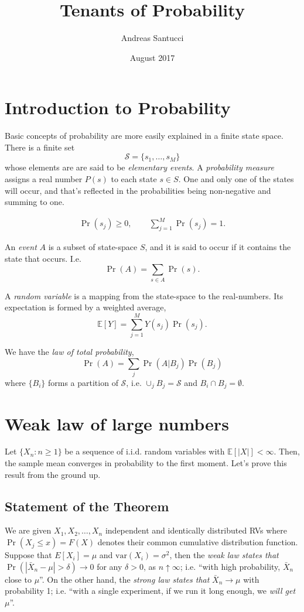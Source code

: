 \documentclass[12pt]{article}  \usepackage{algorithm2e} \usepackage{amsmath} \usepackage{amsthm} \usepackage{amsfonts} \usepackage{bbm} \usepackage{color,soul} \usepackage{framed} \usepackage[margin=0.5in]{geometry} \usepackage{hyperref} \usepackage{mathtools} \usepackage[dvipsnames]{xcolor}
\begin{document}
\title{\textbf{Tenants of Probability}}
\author{Andreas Santucci}
\date{August 2017}
\maketitle

\section{Introduction to Probability}
Basic concepts of probability are more easily explained in a finite state space.
There is a finite set
\[
\mathcal S = \{s_1, \ldots, s_M\}
\]
whose elements are are said to be \emph{elementary events}. 
A \emph{probability measure} assigns a real number $P(s)$ to each state $s \in S$.
One and only one of the states will occur, and that's reflected in the probabilities being
non-negative and summing to one.

\begin{align*}   \Pr(s_j) \geq 0, \hspace{25pt} \sum_{j=1}^M \Pr(s_j) = 1. \end{align*}

An \emph{event} $A$ is a subset of state-space $S$, and it is said to occur if it contains the state that occurs. I.e.
\[
\Pr(A) = \sum_{s \in A} \Pr(s).
\]

A \emph{random variable} is a mapping from the state-space to the real-numbers. Its expectation is 
formed by a weighted average,
\[
\mathbb E[Y] = \sum_{j=1}^{M} Y(s_j) \Pr(s_j).
\]

We have the \emph{law of total probability},
\[
\Pr(A) = \sum_{j} \Pr(A|B_j) \Pr(B_j)
\]
where $\{B_i\}$ forms a partition of $\mathcal S$, i.e. $\cup_j B_j = \mathcal S$ and $B_i \cap B_j = \emptyset$.

\section{Weak law of large numbers}
Let $\{X_n : n \geq 1\}$ be a sequence of i.i.d. random variables with
$\mathbb E[|X|] < \infty$. Then, the sample mean converges in probability to the first moment.
Let's prove this result from the ground up.

\subsection{Statement of the Theorem} We are given $X_1, X_2, \ldots, X_n$ independent
and identically distributed RVs where $\Pr(X_j \leq x) = F(X)$ denotes 
their common cumulative distribution function. Suppose that $E[X_i]=\mu$
and $\textrm{var}(X_i) = \sigma^2$, then the \emph{weak law states that}
 $\Pr(|\bar{X}_n - \mu| > \delta) \longrightarrow 0$ for any $\delta > 0$,
as $n \uparrow \infty$; i.e.
``with high probability, $\bar{X}_n$ close to $\mu$''. 
On the other hand, the \emph{strong law states that} $\bar{X}_n \longrightarrow \mu$ with probability 1; i.e.
``with a single experiment, if we run it long enough, we \emph{will get} $\mu$''. 
\end{document}
